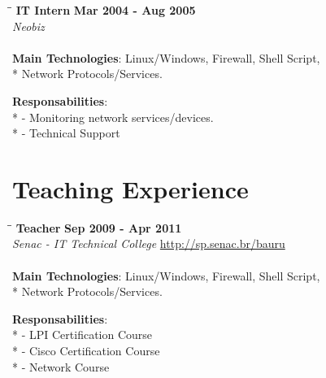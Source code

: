 \documentclass[margin]{res}
\begin{document}
\begin{resume}
\vspace{-0.1in}
\begin{tabbing}
  \hspace{2.3in}\= \hspace{1.7in}\= \kill %
  \textbf{IT Intern}    \>\>\textbf{Mar 2004 - Aug 2005}\\
  \textit{Neobiz} \\\\
  \textbf{Main Technologies}: Linux/Windows, Firewall, Shell Script,\\* 
  Network Protocols/Services.
\end{tabbing}\vspace{-20pt}      %
\vspace{2mm}\textbf{Responsabilities}: \\*
  - Monitoring network services/devices. \\*
  - Technical Support\\

\section{Teaching Experience}

\vspace{-0.1in}
\begin{tabbing}
  \hspace{2.3in}\= \hspace{1.7in}\= \kill %
  \textbf{Teacher}    \>\>\textbf{Sep 2009 - Apr 2011}\\
  \textit{Senac - IT Technical College} \url{http://sp.senac.br/bauru}\\\\
  \textbf{Main Technologies}: Linux/Windows, Firewall, Shell Script,\\* 
  Network Protocols/Services.
\end{tabbing}\vspace{-20pt}      %
\vspace{2mm}\textbf{Responsabilities}: \\*
  - LPI Certification Course \\*
  - Cisco Certification Course \\*
  - Network Course \\


\end{resume}
\end{document}

